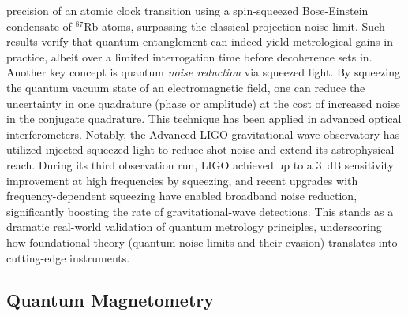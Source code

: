 \documentclass[12pt]{article}
\begin{document}
precision of an atomic clock transition using a spin-squeezed
Bose-Einstein condensate of $^{87}$Rb atoms\cite{Hosten2016},
surpassing the classical projection noise limit. Such results verify
that quantum entanglement can indeed yield metrological gains in
practice, albeit over a limited interrogation time before decoherence
sets in.    Another key concept is quantum \textit{noise reduction}
via squeezed light. By squeezing the quantum vacuum state of an
electromagnetic field, one can reduce the uncertainty in one
quadrature (phase or amplitude) at the cost of increased noise in the
conjugate quadrature. This technique has been applied in advanced
optical interferometers. Notably, the Advanced LIGO gravitational-wave
observatory has utilized injected squeezed light to reduce shot noise
and extend its astrophysical reach\cite{LIGO2019}. During its third
observation run, LIGO achieved up to a 3~dB sensitivity improvement at
high frequencies by squeezing, and recent upgrades with
frequency-dependent squeezing have enabled broadband noise reduction,
significantly boosting the rate of gravitational-wave
detections\cite{LIGO2019}. This stands as a dramatic real-world
validation of quantum metrology principles, underscoring how
foundational theory (quantum noise limits and their evasion)
translates into cutting-edge instruments.   
\subsection{Quantum Magnetometry}
\end{document}

